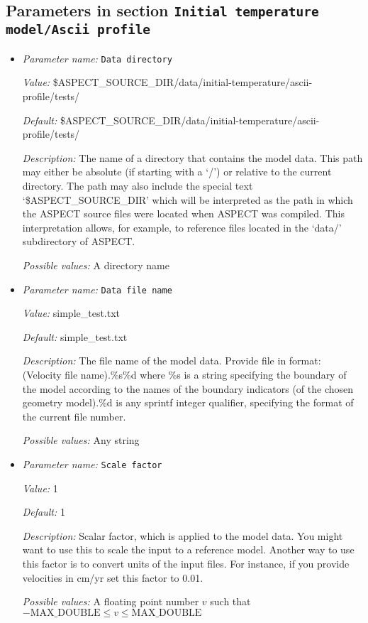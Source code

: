 \subsection{Parameters in section \tt Initial temperature model/Ascii profile}
\label{parameters:Initial_20temperature_20model/Ascii_20profile}

\begin{itemize}
\item {\it Parameter name:} {\tt Data directory}
\label{parameters:Initial temperature model/Ascii profile/Data directory}


{\it Value:} \$ASPECT\_SOURCE\_DIR/data/initial-temperature/ascii-profile/tests/


{\it Default:} \$ASPECT\_SOURCE\_DIR/data/initial-temperature/ascii-profile/tests/


{\it Description:} The name of a directory that contains the model data. This path may either be absolute (if starting with a `/') or relative to the current directory. The path may also include the special text `\$ASPECT\_SOURCE\_DIR' which will be interpreted as the path in which the ASPECT source files were located when ASPECT was compiled. This interpretation allows, for example, to reference files located in the `data/' subdirectory of ASPECT. 


{\it Possible values:} A directory name
\item {\it Parameter name:} {\tt Data file name}
\label{parameters:Initial temperature model/Ascii profile/Data file name}


{\it Value:} simple\_test.txt


{\it Default:} simple\_test.txt


{\it Description:} The file name of the model data. Provide file in format: (Velocity file name).\%s\%d where \%s is a string specifying the boundary of the model according to the names of the boundary indicators (of the chosen geometry model).\%d is any sprintf integer qualifier, specifying the format of the current file number. 


{\it Possible values:} Any string
\item {\it Parameter name:} {\tt Scale factor}
\label{parameters:Initial temperature model/Ascii profile/Scale factor}


{\it Value:} 1


{\it Default:} 1


{\it Description:} Scalar factor, which is applied to the model data. You might want to use this to scale the input to a reference model. Another way to use this factor is to convert units of the input files. For instance, if you provide velocities in cm/yr set this factor to 0.01.


{\it Possible values:} A floating point number $v$ such that $-\text{MAX\_DOUBLE} \leq v \leq \text{MAX\_DOUBLE}$
\end{itemize}

